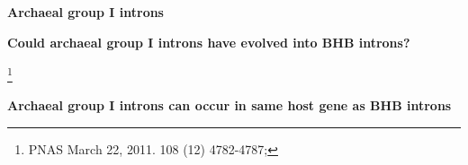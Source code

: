 \documentclass[landscape]{slides}
\begin{document}
\begin{slide}
\begin{center}
\textbf{Archaeal group I introns}
\end{center}


\vfill
\end{slide}
\begin{slide}
\begin{center}
\textbf{Could archaeal group I introns have evolved into BHB introns?}
\end{center}
\footnote{PNAS March 22, 2011. 108 (12) 4782-4787;}

\textbf{Archaeal group I introns can occur in same host gene as BHB introns}

\vfill
\end{slide}
\end{document}
